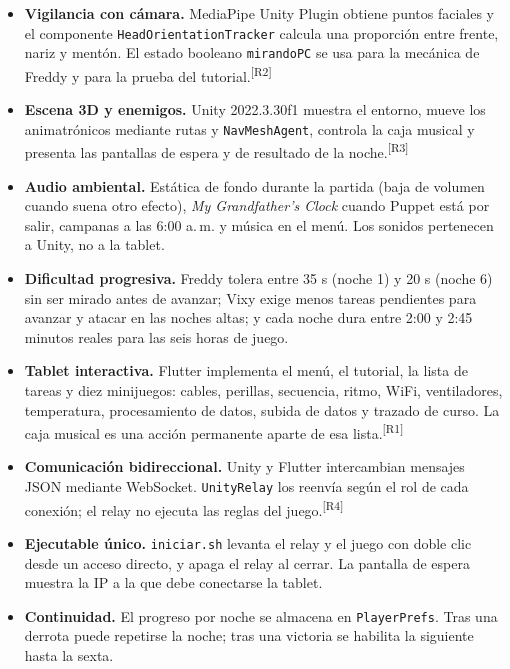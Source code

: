 \documentclass[11pt,a4paper]{article}
\newcommand{\codigo}[1]{\texttt{#1}}
\newcommand{\cita}[1]{\textsuperscript{\textcolor{Rojo}{[#1]}}}
\begin{document}
\begin{itemize}
  \item \textbf{Vigilancia con cámara.} MediaPipe Unity Plugin obtiene puntos faciales y el componente \codigo{HeadOrientationTracker} calcula una proporción entre frente, nariz y mentón. El estado booleano \codigo{mirandoPC} se usa para la mecánica de Freddy y para la prueba del tutorial.\cita{R2}
  \item \textbf{Escena 3D y enemigos.} Unity 2022.3.30f1 muestra el entorno, mueve los animatrónicos mediante rutas y \codigo{NavMeshAgent}, controla la caja musical y presenta las pantallas de espera y de resultado de la noche.\cita{R3}
  \item \textbf{Audio ambiental.} Estática de fondo durante la partida (baja de volumen cuando suena otro efecto), \textit{My Grandfather's Clock} cuando Puppet está por salir, campanas a las 6:00 a.\,m. y música en el menú. Los sonidos pertenecen a Unity, no a la tablet.
  \item \textbf{Dificultad progresiva.} Freddy tolera entre 35 s (noche 1) y 20 s (noche 6) sin ser mirado antes de avanzar; Vixy exige menos tareas pendientes para avanzar y atacar en las noches altas; y cada noche dura entre 2:00 y 2:45 minutos reales para las seis horas de juego.
  \item \textbf{Tablet interactiva.} Flutter implementa el menú, el tutorial, la lista de tareas y diez minijuegos: cables, perillas, secuencia, ritmo, WiFi, ventiladores, temperatura, procesamiento de datos, subida de datos y trazado de curso. La caja musical es una acción permanente aparte de esa lista.\cita{R1}
  \item \textbf{Comunicación bidireccional.} Unity y Flutter intercambian mensajes JSON mediante WebSocket. \codigo{UnityRelay} los reenvía según el rol de cada conexión; el relay no ejecuta las reglas del juego.\cita{R4}
  \item \textbf{Ejecutable único.} \codigo{iniciar.sh} levanta el relay y el juego con doble clic desde un acceso directo, y apaga el relay al cerrar. La pantalla de espera muestra la IP a la que debe conectarse la tablet.
  \item \textbf{Continuidad.} El progreso por noche se almacena en \codigo{PlayerPrefs}. Tras una derrota puede repetirse la noche; tras una victoria se habilita la siguiente hasta la sexta.
\end{itemize}
\end{document}
